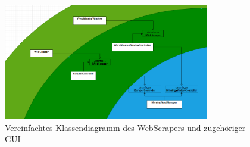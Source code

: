 \begin{figure}[htb]
\centering
\includegraphics[width=0.8\textwidth]{Bilder/CleanArchitectureWebScraper.PNG}
\caption{\label{Abb:CleanArchitectureWebScraper}Vereinfachtes Klassendiagramm des WebScrapers und zugehöriger GUI}
\end{figure}

\endinput